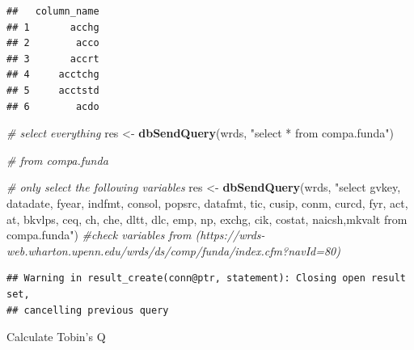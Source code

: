 \documentclass[
]{book}
\newenvironment{Shaded}{\begin{snugshade}}{\end{snugshade}}
\newcommand{\CommentTok}[1]{\textcolor[rgb]{0.56,0.35,0.01}{\textit{#1}}}
\newcommand{\DataTypeTok}[1]{\textcolor[rgb]{0.13,0.29,0.53}{#1}}
\newcommand{\DecValTok}[1]{\textcolor[rgb]{0.00,0.00,0.81}{#1}}
\newcommand{\KeywordTok}[1]{\textcolor[rgb]{0.13,0.29,0.53}{\textbf{#1}}}
\newcommand{\NormalTok}[1]{#1}
\newcommand{\OperatorTok}[1]{\textcolor[rgb]{0.81,0.36,0.00}{\textbf{#1}}}
\newcommand{\StringTok}[1]{\textcolor[rgb]{0.31,0.60,0.02}{#1}}
\begin{document}
\begin{verbatim}
##   column_name
## 1       acchg
## 2        acco
## 3       accrt
## 4     acctchg
## 5     acctstd
## 6        acdo
\end{verbatim}

\begin{Shaded}
\begin{Highlighting}[]
\CommentTok{# select everything}
\NormalTok{res <-}\StringTok{ }\KeywordTok{dbSendQuery}\NormalTok{(wrds, }\StringTok{"select * from compa.funda"}\NormalTok{)}

\CommentTok{# from compa.funda}

\CommentTok{# only select the following variables}
\NormalTok{res <-}\StringTok{ }\KeywordTok{dbSendQuery}\NormalTok{(wrds, }\StringTok{"select gvkey, datadate, fyear, indfmt, consol, popsrc, datafmt, tic, cusip, conm, curcd, fyr, act, at, bkvlps, ceq, ch, che, dltt, dlc, emp, np, exchg, cik, costat, naicsh,mkvalt from compa.funda"}\NormalTok{) }\CommentTok{#check variables from (https://wrds-web.wharton.upenn.edu/wrds/ds/comp/funda/index.cfm?navId=80)}
\end{Highlighting}
\end{Shaded}

\begin{verbatim}
## Warning in result_create(conn@ptr, statement): Closing open result set,
## cancelling previous query
\end{verbatim}

\begin{Shaded}
\end{Shaded}

Calculate Tobin's Q
\end{document}
